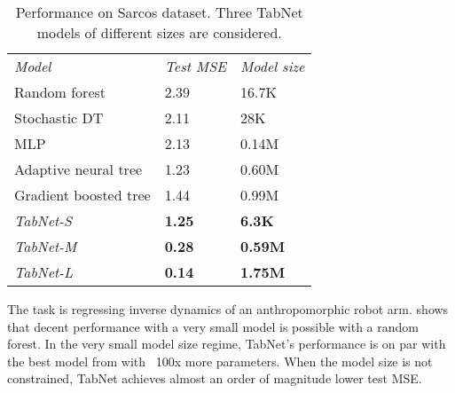 \begin{table}[h!]
\vspace{0cm}
\caption{Performance on Sarcos dataset. Three TabNet models of different sizes are considered. }
\vspace{0cm}
\centering
\begin{tabular}{|C{3.7 cm}|C{1.5 cm}|C{1.7 cm}|}
    \textit{Model} & \textit{Test MSE}  & \textit{Model size}        \\ 
    Random forest & 2.39 &   16.7K  \\ 
    Stochastic DT & 2.11  &   28K     \\ 
    MLP & 2.13 &   0.14M     \\ 
    Adaptive neural tree  &  1.23  &  0.60M  \\ 
    Gradient boosted tree & 1.44   &   0.99M     \\ \hhline{|=|=|=|}
    \textit{TabNet-S}  &  \textbf{1.25} & \textbf{6.3K} \\ 
    \textit{TabNet-M}  &  \textbf{0.28} & \textbf{0.59M} \\ 
    \textit{TabNet-L}  &  \textbf{0.14} & \textbf{1.75M} \\ 
\end{tabular}
\label{table:sarcos}
\vspace{0cm}
\end{table}

\vspace{0cm}
\noindent{} The task is regressing inverse dynamics of an anthropomorphic robot arm. 
\citep{ant} shows that decent performance with a very small model is possible with a random forest. 
In the very small model size regime, TabNet's performance is on par with the best model from \citep{ant} with ~100x more parameters. 
When the model size is not constrained, TabNet achieves almost an order of magnitude lower test MSE. 

